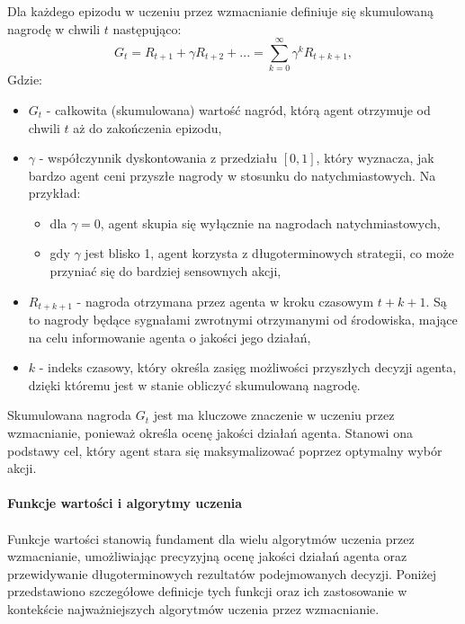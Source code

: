 \documentclass[a4paper, 12pt]{article}
\numberwithin{equation}{section}
\begin{document}
    Dla każdego epizodu w uczeniu przez wzmacnianie definiuje się skumulowaną nagrodę w chwili \( t \) następująco:
    \begin{equation}
    G_t = R_{t+1} + \gamma R_{t+2} + ... = \sum_{k=0}^{\infty} \gamma^k R_{t+k+1}, 
    \end{equation}
    Gdzie:
    \begin{itemize}
        \item \( G_t \) - całkowita (skumulowana) wartość nagród, którą agent otrzymuje od chwili \( t \) aż do zakończenia epizodu,
        \item \( \gamma \) - współczynnik dyskontowania z przedziału \( [0,1] \), który wyznacza, jak bardzo agent ceni przyszłe nagrody w stosunku do natychmiastowych.
        Na przykład:
        \begin{itemize}
            \item dla \( \gamma = 0 \), agent skupia się wyłącznie na nagrodach natychmiastowych,
            \item gdy \( \gamma \) jest blisko 1, agent korzysta z długoterminowych strategii, co może przyniać się do bardziej sensownych akcji,
        \end{itemize}
        \item \( R_{t+k+1} \) - nagroda otrzymana przez agenta w kroku czasowym \( t + k + 1 \). Są to nagrody będące sygnałami zwrotnymi otrzymanymi
        od środowiska, mające na celu informowanie agenta o jakości jego działań,
        \item \( k \) - indeks czasowy, który określa zasięg możliwości przyszłych decyzji agenta, dzięki któremu jest w stanie obliczyć skumulowaną nagrodę.
    \end{itemize}
    Skumulowana nagroda \( G_t \) jest ma kluczowe znaczenie w uczeniu przez wzmacnianie, ponieważ określa ocenę jakości działań agenta. Stanowi ona podstawy cel, który agent stara się 
    maksymalizować poprzez optymalny wybór akcji.
    \\ \\ 
    \textbf{Funkcje wartości i algorytmy uczenia}
    \\ \\ 
    Funkcje wartości stanowią fundament dla wielu algorytmów uczenia przez wzmacnianie, umożliwiając precyzyjną ocenę jakości działań agenta oraz przewidywanie długoterminowych rezultatów podejmowanych decyzji. Poniżej przedstawiono szczegółowe definicje tych funkcji oraz ich zastosowanie w kontekście najważniejszych algorytmów uczenia przez wzmacnianie.
\end{document}
